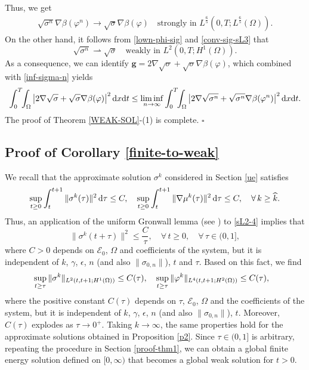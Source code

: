 \documentclass[11pt,reqno]{amsart}
\def\d{{\rm d}}
\begin{document}
%
Thus, we get
%
\begin{align*}
\sqrt{\sigma^n} \nabla \beta(\varphi^n) \to \sqrt{\sigma} \nabla \beta(\varphi) \quad
\text{strongly in } L^\frac65(0,T;L^\frac65(\Omega)).
\end{align*}
%
On the other hand, it follows from \eqref{lown-phi-sig} and \eqref{conv-sig-sL3} that
$$
\sqrt{\sigma^n} \rightharpoonup \sqrt{\sigma}
\quad \text{weakly in } L^2(0,T;H^1(\Omega)).
$$
As a consequence, we can identify $\bm{g}= 2\nabla \sqrt{\sigma} + \sqrt{\sigma} \nabla \beta(\varphi)$,
which combined with \eqref{inf-sigma-n} yields
%
\begin{align}
\int_0^T\!\!\int_\Omega \big|2\nabla \sqrt{\sigma} + \sqrt{\sigma} \nabla \beta(\varphi)\big|^2\,\d x\d t\leq
\liminf_{n\to \infty} \int_0^T \!\!\int_\Omega \big| 2\nabla \sqrt{\sigma^n} + \sqrt{\sigma^n} \nabla \beta(\varphi^n) \big|^2 \,\d x\d t.
\notag
\end{align}
%
The proof of Theorem \ref{WEAK-SOL}-(1) is complete.
\hfill $\square$

\subsection{Proof of Corollary \ref{finite-to-weak}}
We recall that the approximate solution $\sigma^{k}$ considered in Section \ref{ue} satisfies
%
$$
\sup_{t\geq 0}\int_t^{t+1} \|\sigma^k(\tau) \|^2 \, \d \tau\leq C,
\quad
\sup_{t\geq 0}\int_t^{t+1} \|\nabla \mu^k(\tau) \|^2 \, \d \tau\leq C,
\quad \forall \, k \geq \widehat{k}.
$$
Thus, an application of the uniform Gronwall lemma (see \cite[Chapter III, Lemma 1.1]{Temam}) to \eqref{sL2-4} implies that
$$
\|\sigma^k(t+\tau)\|^2 \leq \frac{C}{\tau},\quad \forall\, t \geq 0,\quad \forall\, \tau\in (0,1],
$$
where $C>0$ depends on $\mathcal{E}_0$, $\Omega$ and coefficients of the system, but it is independent of $k$, $\gamma$, $\epsilon$, $n$ (and also $\|\sigma_{0,n}\|$), $t$ and $\tau$. Based on this fact, we find
%
\begin{align}
&\sup_{t\geq \tau} \|\sigma^k\|_{L^2(t,t+1; H^1(\Omega))}\leq C(\tau),
\quad
\sup_{t\geq \tau}\|\varphi^k\|_{L^4(t,t+1; H^2(\Omega))}\leq C(\tau),
\notag
\end{align}
%
where the positive constant $C(\tau)$ depends on $\tau$, $\mathcal{E}_0$, $\Omega$ and the coefficients of the system, but it is independent of $k$, $\gamma$, $\epsilon$, $n$ (and also $\|\sigma_{0,n}\|$), $t$. Moreover, $C(\tau)$ explodes as $\tau\to 0^+$.
Taking $k\to \infty$, the same properties hold for the approximate solutions obtained in Proposition \ref{p2}.
Since $\tau\in (0,1]$ is arbitrary, repeating the procedure in Section \ref{proof-thm1}, we can obtain a global finite energy solution defined on $[0,\infty)$ that becomes a global weak solution for $t>0$.
\end{document}
